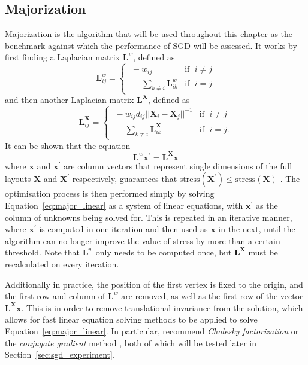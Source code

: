 \subsection{Majorization}
\label{sec:majorization}
Majorization is the algorithm that will be used throughout this chapter as the benchmark against which the performance of SGD will be assessed.
It works by first finding a Laplacian matrix $\mathbf{L}^w$, defined as
\begin{equation}
  \mathbf{L}_{ij}^w =
  \begin{cases}
    \;-w_{ij} & \text{if }\;i\neq j\\
    \;-\sum_{k\neq i}\mathbf{L}_{ik}^w & \text{if }\;i=j
  \end{cases}
  \label{eq:major_Lw}
\end{equation}
and then another Laplacian matrix $\mathbf{L^X}$, defined as
\begin{equation}
  \mathbf{L}_{ij}^\mathbf{X} =
  \begin{cases}
    \;-w_{ij}d_{ij}||\mathbf{X}_i-\mathbf{X}_j||^{-1} & \text{if }\;i\neq j\\
    \;-\sum_{k\neq i}\mathbf{L}_{ik}^\mathbf{X} & \text{if }\;i=j.
  \end{cases}
  \label{eq:major_LX}
\end{equation}
It can be shown that the equation
\begin{equation}
  \mathbf{L}^w\mathbf{x}^\prime = \mathbf{L^Xx}
  \label{eq:major_linear}
\end{equation}
where $\mathbf{x}$ and $\mathbf{x}^\prime$ are column vectors that represent single dimensions of the full layouts $\mathbf{X}$ and $\mathbf{X}^\prime$ respectively, guarantees that $\text{stress}(\mathbf{X}^\prime) \leq \text{stress}(\mathbf{X})$ \citep{Gansner2004}.
The optimisation process is then performed simply by solving Equation~\eqref{eq:major_linear} as a system of linear equations, with $\mathbf{x}^\prime$ as the column of unknowns being solved for. This is repeated in an iterative manner, where $\mathbf{x}^\prime$ is computed in one iteration and then used as $\mathbf{x}$ in the next, until the algorithm can no longer improve the value of stress by more than a certain threshold. Note that $\mathbf{L}^w$ only needs to be computed once, but $\mathbf{L}^\mathbf{X}$ must be recalculated on every iteration.

Additionally in practice, the position of the first vertex is fixed to the origin, and the first row and column of $\mathbf{L}^w$ are removed, as well as the first row of the vector $\mathbf{L^Xx}$. This is in order to remove translational invariance from the solution, which allows for fast linear equation solving methods to be applied to solve Equation~\ref{eq:major_linear}.
In particular, \citet{Gansner2004} recommend \emph{Cholesky factorization} \citep{Press2007Cholesky} or the \emph{conjugate gradient} method \citep{Press2007Conjugate}, both of which will be tested later in Section~\ref{sec:sgd_experiment}. 

